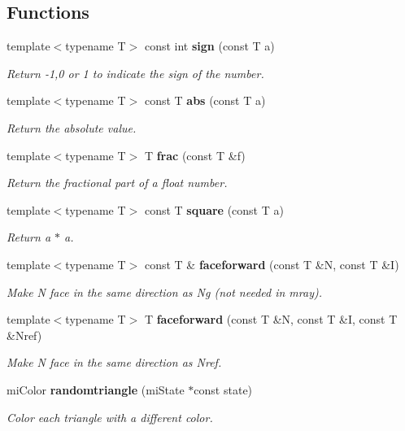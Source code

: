 \subsection*{Functions}
\begin{CompactItemize}
\item 
template$<$typename T$>$ const int {\bf sign} (const T a)
\begin{CompactList}\small\item\em Return -1,0 or 1 to indicate the sign of the number. \item\end{CompactList}\item 
template$<$typename T$>$ const T {\bf abs} (const T a)
\begin{CompactList}\small\item\em Return the absolute value. \item\end{CompactList}\item 
template$<$typename T$>$ T {\bf frac} (const T \&f)
\begin{CompactList}\small\item\em Return the fractional part of a float number. \item\end{CompactList}\item 
template$<$typename T$>$ const T {\bf square} (const T a)
\begin{CompactList}\small\item\em Return a $\ast$ a. \item\end{CompactList}\item 
template$<$typename T$>$ const T \& {\bf faceforward} (const T \&N, const T \&I)
\begin{CompactList}\small\item\em Make N face in the same direction as Ng (not needed in mray). \item\end{CompactList}\item 
template$<$typename T$>$ T {\bf faceforward} (const T \&N, const T \&I, const T \&Nref)
\begin{CompactList}\small\item\em Make N face in the same direction as Nref. \item\end{CompactList}\item 
mi\-Color {\bf randomtriangle} (mi\-State $\ast$const state)
\begin{CompactList}\small\item\em Color each triangle with a different color. \item\end{CompactList}\item 

\end{CompactItemize}
